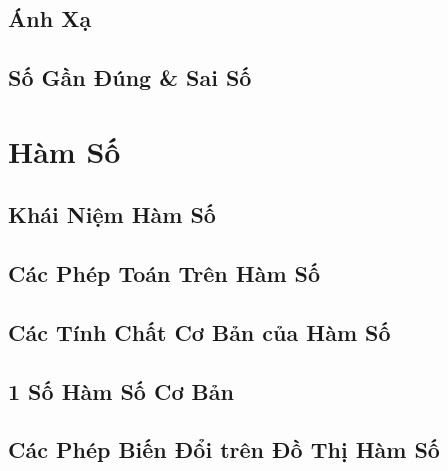 \documentclass{article}
\numberwithin{equation}{section}
\begin{document}

\subsection{Ánh Xạ}


\subsection{Số Gần Đúng \& Sai Số}


\section{Hàm Số}

\subsection{Khái Niệm Hàm Số}


\subsection{Các Phép Toán Trên Hàm Số}


\subsection{Các Tính Chất Cơ Bản của Hàm Số}


\subsection{1 Số Hàm Số Cơ Bản}


\subsection{Các Phép Biến Đổi trên Đồ Thị Hàm Số}
\end{document}
